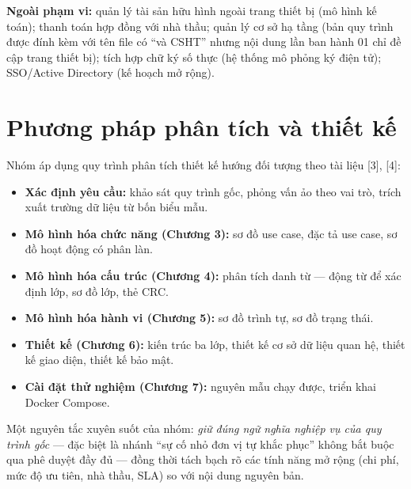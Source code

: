 \textbf{Ngoài phạm vi:} quản lý tài sản hữu hình ngoài trang thiết bị (mô hình kế toán); thanh toán hợp đồng với nhà thầu; quản lý cơ sở hạ tầng (bản quy trình được đính kèm với tên file có ``và CSHT'' nhưng nội dung lần ban hành 01 chỉ đề cập trang thiết bị); tích hợp chữ ký số thực (hệ thống mô phỏng ký điện tử); SSO/Active Directory (kế hoạch mở rộng).

\section{Phương pháp phân tích và thiết kế}

Nhóm áp dụng quy trình phân tích thiết kế hướng đối tượng theo tài liệu [3], [4]:
\begin{itemize}
  \item \textbf{Xác định yêu cầu:} khảo sát quy trình gốc, phỏng vấn ảo theo vai trò, trích xuất trường dữ liệu từ bốn biểu mẫu.
  \item \textbf{Mô hình hóa chức năng (Chương 3):} sơ đồ use case, đặc tả use case, sơ đồ hoạt động có phân làn.
  \item \textbf{Mô hình hóa cấu trúc (Chương 4):} phân tích danh từ — động từ để xác định lớp, sơ đồ lớp, thẻ CRC.
  \item \textbf{Mô hình hóa hành vi (Chương 5):} sơ đồ trình tự, sơ đồ trạng thái.
  \item \textbf{Thiết kế (Chương 6):} kiến trúc ba lớp, thiết kế cơ sở dữ liệu quan hệ, thiết kế giao diện, thiết kế bảo mật.
  \item \textbf{Cài đặt thử nghiệm (Chương 7):} nguyên mẫu chạy được, triển khai Docker Compose.
\end{itemize}

Một nguyên tắc xuyên suốt của nhóm: \emph{giữ đúng ngữ nghĩa nghiệp vụ của quy trình gốc} — đặc biệt là nhánh ``sự cố nhỏ đơn vị tự khắc phục'' không bắt buộc qua phê duyệt đầy đủ — đồng thời tách bạch rõ các tính năng mở rộng (chi phí, mức độ ưu tiên, nhà thầu, SLA) so với nội dung nguyên bản.
